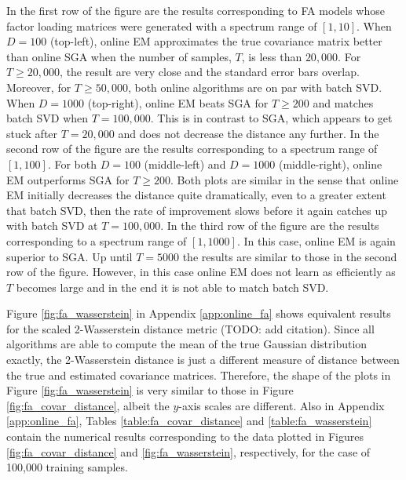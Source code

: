 \documentclass[msc,deptreport.inf]{infthesis} %
\begin{document}
In the first row of the figure are the results corresponding to FA models whose factor loading matrices were generated with a spectrum range of $[1, 10]$. When $D=100$ (top-left), online EM approximates the true covariance matrix better than online SGA when the number of samples, $T$, is less than $20,000$. For $T \geq 20,000$, the result are very close and the standard error bars overlap. Moreover, for $T \geq 50,000$, both online algorithms are on par with batch SVD. When $D=1000$ (top-right), online EM beats SGA for $T \geq 200$ and matches batch SVD when $T=100,000$. This is in contrast to SGA, which appears to get stuck after $T=20,000$ and does not decrease the distance any further. In the second row of the figure are the results corresponding to a spectrum range of $[1, 100]$. For both $D=100$ (middle-left) and $D=1000$ (middle-right), online EM outperforms SGA for $T \geq 200$. Both plots are similar in the sense that online EM initially decreases the distance quite dramatically, even to a greater extent that batch SVD, then the rate of improvement slows before it again catches up with batch SVD at $T=100,000$. In the third row of the figure are the results corresponding to a spectrum range of $[1, 1000]$. In this case, online EM is again superior to SGA. Up until $T=5000$ the results are similar to those in the second row of the figure. However, in this case online EM does not learn as efficiently as $T$ becomes large and in the end it is not able to match batch SVD. 

Figure \ref{fig:fa_wasserstein} in Appendix \ref{app:online_fa} shows equivalent results for the scaled 2-Wasserstein distance metric (TODO: add citation). Since all algorithms are able to compute the mean of the true Gaussian distribution exactly, the 2-Wasserstein distance is just a different measure of distance between the true and estimated covariance matrices. Therefore, the shape of the plots in Figure \ref{fig:fa_wasserstein} is very similar to those in Figure \ref{fig:fa_covar_distance}, albeit the $y$-axis scales are different. Also in Appendix \ref{app:online_fa}, Tables \ref{table:fa_covar_distance} and \ref{table:fa_wasserstein} contain the numerical results corresponding to the data plotted in  Figures \ref{fig:fa_covar_distance} and \ref{fig:fa_wasserstein}, respectively, for the case of 100,000 training samples.
\end{document}
